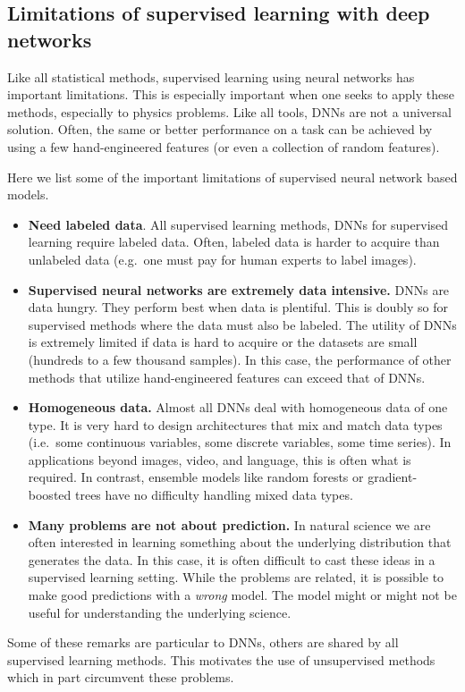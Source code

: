 \documentclass[%
oneside,                 %
final,                   %
10pt]{article}
\begin{document}
\subsection{Limitations of supervised learning with deep networks}

Like all statistical methods, supervised learning using neural
networks has important limitations. This is especially important when
one seeks to apply these methods, especially to physics problems. Like
all tools, DNNs are not a universal solution. Often, the same or
better performance on a task can be achieved by using a few
hand-engineered features (or even a collection of random
features). 

Here we list some of the important limitations of supervised neural network based models. 

\begin{itemize}
\item \textbf{Need labeled data}. All supervised learning methods, DNNs for supervised learning require labeled data. Often, labeled data is harder to acquire than unlabeled data (e.g.~one must pay for human experts to label images).

\item \textbf{Supervised neural networks are extremely data intensive.} DNNs are data hungry. They perform best when data is plentiful. This is doubly so for supervised methods where the data must also be labeled. The utility of DNNs is extremely limited if data is hard to acquire or the datasets are small (hundreds to a few thousand samples). In this case, the performance of other methods that utilize hand-engineered features can exceed that of DNNs.

\item \textbf{Homogeneous data.} Almost all DNNs deal with homogeneous data of one type. It is very hard to design architectures that mix and match data types (i.e.~some continuous variables, some discrete variables, some time series). In applications beyond images, video, and language, this is often what is required. In contrast, ensemble models like random forests or gradient-boosted trees have no difficulty handling mixed data types.

\item \textbf{Many problems are not about prediction.} In natural science we are often interested in learning something about the underlying distribution that generates the data. In this case, it is often difficult to cast these ideas in a supervised learning setting. While the problems are related, it is possible to make good predictions with a \emph{wrong} model. The model might or might not be useful for understanding the underlying science.
\end{itemize}

\noindent
Some of these remarks are particular to DNNs, others are shared by all supervised learning methods. This motivates the use of unsupervised methods which in part circumvent these problems.



\end{document}
